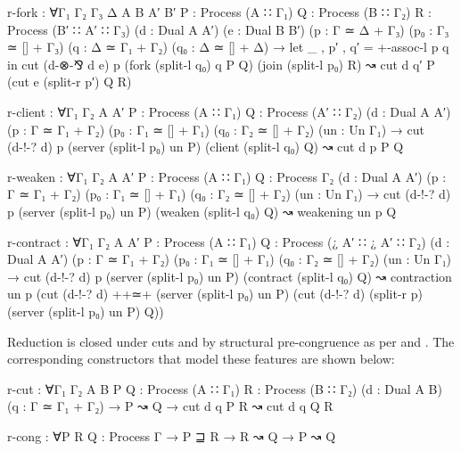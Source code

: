 \begin{AgdaAlign}
\begin{code}[hide]
  r-fork      :
    ∀{Γ₁ Γ₂ Γ₃ Δ A B A′ B′}
    {P : Process (A ∷ Γ₁)} {Q : Process (B ∷ Γ₂)} {R : Process (B′ ∷ A′ ∷ Γ₃)}
    (d : Dual A A′) (e : Dual B B′) (p : Γ ≃ Δ + Γ₃) (p₀ : Γ₃ ≃ [] + Γ₃)
    (q : Δ ≃ Γ₁ + Γ₂) (q₀ : Δ ≃ [] + Δ) →
    let _ , p′ , q′ = +-assoc-l p q in
    cut (d-⊗-⅋ d e) p
        (fork (split-l q₀) q P Q)
        (join (split-l p₀) R) ↝ cut d q′ P (cut e (split-r p′) Q R)

  r-client    :
    ∀{Γ₁ Γ₂ A A′}
    {P : Process (A ∷ Γ₁)} {Q : Process (A′ ∷ Γ₂)} (d : Dual A A′)
    (p : Γ ≃ Γ₁ + Γ₂) (p₀ : Γ₁ ≃ [] + Γ₁) (q₀ : Γ₂ ≃ [] + Γ₂) (un : Un Γ₁) →
    cut (d-!-? d) p
      (server (split-l p₀) un P)
      (client (split-l q₀) Q) ↝ cut d p P Q

  r-weaken    :
    ∀{Γ₁ Γ₂ A A′}
    {P : Process (A ∷ Γ₁)} {Q : Process Γ₂}
    (d : Dual A A′) (p : Γ ≃ Γ₁ + Γ₂) (p₀ : Γ₁ ≃ [] + Γ₁) (q₀ : Γ₂ ≃ [] + Γ₂) (un : Un Γ₁) →
    cut (d-!-? d) p
        (server (split-l p₀) un P)
        (weaken (split-l q₀) Q) ↝ weakening un p Q

  r-contract  :
    ∀{Γ₁ Γ₂ A A′}
    {P : Process (A ∷ Γ₁)} {Q : Process (¿ A′ ∷ ¿ A′ ∷ Γ₂)}
    (d : Dual A A′) (p : Γ ≃ Γ₁ + Γ₂) (p₀ : Γ₁ ≃ [] + Γ₁) (q₀ : Γ₂ ≃ [] + Γ₂) (un : Un Γ₁) →
    cut (d-!-? d) p
      (server (split-l p₀) un P)
      (contract (split-l q₀) Q) ↝
      contraction un p
        (cut (d-!-? d) ++≃+
             (server (split-l p₀) un P)
             (cut (d-!-? d) (split-r p) (server (split-l p₀) un P) Q))
\end{code}

Reduction is closed under cuts and by structural pre-congruence as per \RCut and
\RCong. The corresponding constructors that model these features are shown
below:

\begin{code}
  r-cut       : ∀{Γ₁ Γ₂ A B} {P Q : Process (A ∷ Γ₁)} {R : Process (B ∷ Γ₂)}
                (d : Dual A B) (q : Γ ≃ Γ₁ + Γ₂) → P ↝ Q →
                cut d q P R ↝ cut d q Q R

  r-cong      : ∀{P R Q : Process Γ} → P ⊒ R → R ↝ Q → P ↝ Q
\end{code}
\end{AgdaAlign}
